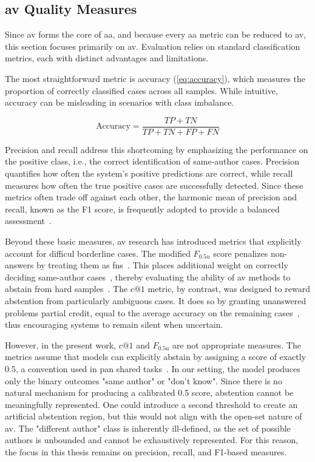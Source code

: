 \subsection{\ac{av} Quality Measures}
\label{subsec:av_quality_measures}

Since \ac{av} forms the core of \ac{aa}, and because every \ac{aa} metric can be reduced to \ac{av}, this section focuses primarily on \ac{av}. 
Evaluation relies on standard classification metrics, each with distinct advantages and limitations.

The most straightforward metric is accuracy (\autoref{eq:accuracy}), which measures the proportion of correctly classified cases across all samples. 
While intuitive, accuracy can be misleading in scenarios with class imbalance. 

\begin{equation}\label{eq:accuracy}
    \text{Accuracy} = \frac{TP + TN}{TP + TN + FP + FN}
\end{equation}

Precision and recall address this shortcoming by emphasizing the performance on the positive class, i.e., the correct identification of same-author cases. 
Precision quantifies how often the system’s positive predictions are correct, while recall measures how often the true positive cases are successfully detected. 
Since these metrics often trade off against each other, the harmonic mean of precision and recall, known as the F1 score, is frequently adopted to provide a balanced assessment~\citep{neal_surveying_2018}.

Beyond these basic measures, \ac{av} research has introduced metrics that explicitly account for difficul borderline cases. 
The modified $F_{0.5u}$ score penalizes non-answers by treating them as \acp{fn}~\citep{bevendorff_overview_2024}. 
This places additional weight on correctly deciding same-author cases~\citep{weerasinghe_feature_vector_difference_2021}, thereby evaluating the ability of \ac{av} methods to abstain from hard samples~\citep{tyo_state_2022}. 
The $c@1$ metric, by contrast, was designed to reward abstention from particularly ambiguous cases. 
It does so by granting unanswered problems partial credit, equal to the average accuracy on the remaining cases~\citep{bevendorff_overview_2024}, thus encouraging systems to remain silent when uncertain.

However, in the present work, $c@1$ and $F_{0.5u}$ are not appropriate measures. 
The metrics assume that models can explicitly abstain by assigning a score of exactly 0.5, a convention used in \ac{pan} shared tasks~\citep{tyo_state_2022,bevendorff_overview_2024,kocher_unine_2015}. 
In our setting, the model produces only the binary outcomes "same author" or "don't know". 
Since there is no natural mechanism for producing a calibrated 0.5 score, abstention cannot be meaningfully represented. 
One could introduce a second threshold to create an artificial abstention region, but this would not align with the open-set nature of \ac{av}. 
The "different author" class is inherently ill-defined, as the set of possible authors is unbounded and cannot be exhaustively represented. 
For this reason, the focus in this thesis remains on precision, recall, and F1-based measures. 

